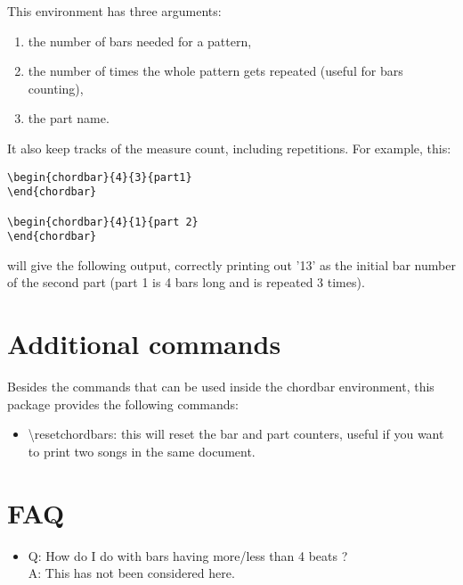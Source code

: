 \documentclass[11pt]{article}
\begin{document}
This environment has three arguments:
\begin{enumerate}
\item the number of bars needed for a pattern,
\item the number of times the whole pattern gets repeated (useful for bars counting),
\item the part name.
\end{enumerate}

It also keep tracks of the measure count, including repetitions. For example, this:

\begin{lstlisting}
\begin{chordbar}{4}{3}{part1}
\end{chordbar}

\begin{chordbar}{4}{1}{part 2}
\end{chordbar}
\end{lstlisting}

will give the following output, correctly printing out '13' as the initial bar number of the second part (part 1 is 4 bars long and is repeated 3 times).

\resetchordbars
\begin{chordbar}{4}{3}{}
\end{chordbar}
\begin{chordbar}{4}{1}{}
\end{chordbar}

\section{Additional commands}

Besides the commands that can be used inside the chordbar environment, this package provides the following commands:

\begin{itemize}
\item {\ttfamily \textbackslash resetchordbars}: this will reset the bar and part counters, useful if you want to print two songs in the same document.
\end{itemize}


\section{FAQ}

\begin{itemize}
\item Q: How do I do with bars having more/less than 4 beats ? \\
A: This has not been considered here.
\end{itemize}
\end{document}
